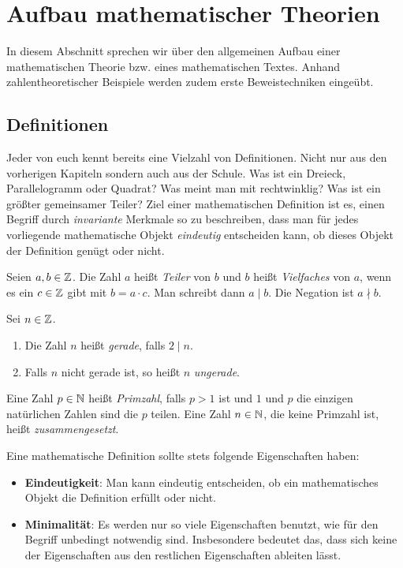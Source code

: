 \chapter{Aufbau mathematischer Theorien}

In diesem Abschnitt sprechen wir über den allgemeinen Aufbau einer mathematischen
Theorie bzw. eines mathematischen Textes.
Anhand zahlentheoretischer Beispiele werden zudem erste Beweistechniken eingeübt.

\section{Definitionen}

Jeder von euch kennt bereits eine Vielzahl von Definitionen.
Nicht nur aus den vorherigen Kapiteln sondern auch aus der Schule.
Was ist ein Dreieck, Parallelogramm oder Quadrat?
Was meint man mit rechtwinklig?
Was ist ein größter gemeinsamer Teiler?
Ziel einer mathematischen Definition ist es, einen Begriff durch
\textit{invariante} Merkmale so zu beschreiben, dass man für jedes vorliegende
mathematische Objekt \textit{eindeutig} entscheiden kann, ob dieses Objekt der
Definition genügt oder nicht.


\begin{mydef}
Seien $a,b \in \mathbb{Z}$.
Die Zahl $a$ heißt \textit{Teiler} von $b$ und $b$ heißt \textit{Vielfaches}
von $a$, wenn es ein $c \in \mathbb{Z}$ gibt mit $b = a \cdot c$.
Man schreibt dann $a \mid b$. Die Negation ist $a \nmid b$.
\end{mydef}


\begin{mydef}
Sei $n \in \mathbb{Z}$.
\begin{enumerate}
\item Die Zahl $n$ heißt \textit{gerade}, falls $2 \mid n$.
\item Falls $n$ nicht gerade ist, so heißt $n$ \textit{ungerade}.
\end{enumerate}
\end{mydef}


\begin{mydef}
Eine Zahl $p \in \mathbb{N}$ heißt \textit{Primzahl}, falls $p > 1$ ist und $1$ und
$p$ die einzigen natürlichen Zahlen sind die $p$ teilen.
Eine Zahl $n \in \mathbb{N}$, die keine Primzahl ist, heißt \textit{zusammengesetzt}.
\end{mydef}


Eine mathematische Definition sollte stets folgende Eigenschaften haben:
\begin{itemize}
\item \textbf{Eindeutigkeit}:
Man kann eindeutig entscheiden, ob ein mathematisches Objekt die Definition
erfüllt oder nicht.

\item \textbf{Minimalität}:
Es werden nur so viele Eigenschaften benutzt, wie für den Begriff unbedingt
notwendig sind.
Insbesondere bedeutet das, dass sich keine der Eigenschaften aus den restlichen
Eigenschaften ableiten lässt.
\end{itemize}


